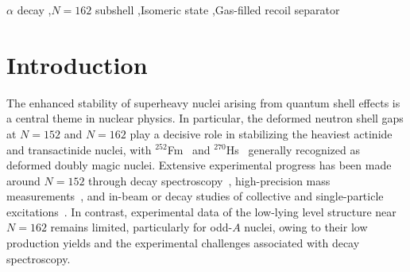 \documentclass[final,5p,times,twocolumn,number,sort&compress]{elsarticle}
\begin{document}
\begin{frontmatter}
\begin{abstract}
Two complete decay chains assigned to $^{273}\mathrm{Ds}$ were observed using the gas-filled recoil separator Spectrometer for Heavy Atoms and Nuclear Structure-2 (SHANS-2) in the $^{238}\mathrm{U}(^{40}\mathrm{Ar},5n)^{273}\mathrm{Ds}$ reaction, yielding a production cross section of $42^{+57}_{-29}$~fb at $\bar{E}^{*}_{\mathrm{CN}} = 50$~MeV. While one chain was consistent with the known short-lived ($T_{1/2}=0.18^{+0.11}_{-0.05}\ \mathrm{ms}$)$\alpha$-decay branch of $^{273}\mathrm{Ds}$, the other began with a $10.858(22)$~MeV $\alpha$ decay occurring $8.320$~ms after implantation, followed $9.363$~s later by an $8.916(21)$~MeV $\alpha$ decay of $^{269}\mathrm{Hs}$. This decay sequence provides independent evidence for a longer-lived branch in $^{273}\mathrm{Ds}$ and directly links it to the low-energy $\alpha$ group in $^{269}\mathrm{Hs}$, and they are discussed by comparing with the literature data as well as the theoretical prediction.
\end{abstract}

\begin{keyword}
$\alpha$ decay \sep $N=162$ subshell \sep Isomeric state \sep Gas-filled recoil separator
\end{keyword}

\end{frontmatter}

\section{Introduction}
\label{introduction}

The enhanced stability of superheavy nuclei arising from quantum shell effects is a central theme in nuclear physics. In particular, the deformed neutron shell gaps at $N=152$ and $N=162$ play a decisive role in stabilizing the heaviest actinide and transactinide nuclei, with $^{252}$Fm~\cite{Orlandi2026} and $^{270}$Hs~\cite{dvorakDoublyMagicNucleus2006} generally recognized as deformed doubly magic nuclei. Extensive experimental progress has been made around $N=152$ through decay spectroscopy~\cite{Ghiorso_1954,Wang_2021,Chen_2025,Zhong-Zhou_2003}, high-precision mass measurements~\cite{Block2010Nature,PhysRevC.87.054324,MinayaRamirez2012DirectMapping}, and in-beam or decay studies of collective and single-particle excitations~\cite{Makii_2007,Sobiczewski_2001}. In contrast, experimental data of the low-lying level structure near \(N=162\) remains limited, particularly for odd-\(A\) nuclei, owing to their low production yields and the experimental challenges associated with decay spectroscopy.
\end{document}
